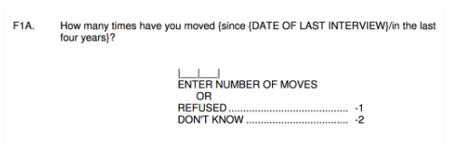 \documentclass{beamer}
\begin{document}
\begin{frame}

\begin{center}
\includegraphics[width=0.95\textwidth]{figures/f5f1a}
\end{center}

\end{frame}
\begin{frame}


\end{frame}
\end{document}
